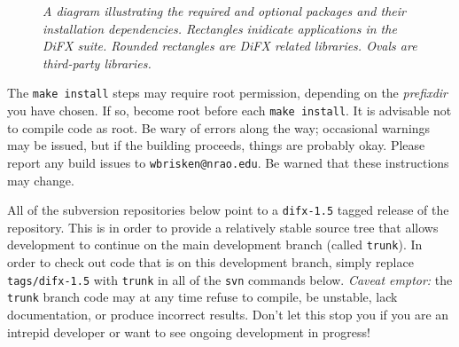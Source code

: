 \begin{figure}[h]
\begin{center}
\caption[dependencies]{
{\em A diagram illustrating the required and optional packages and their installation dependencies.  Rectangles inidicate applications in the DiFX suite.  Rounded rectangles are DiFX related libraries.  Ovals are third-party libraries.}
\label{fig:dependencies}
}
\end{center}
\end{figure}

The {\tt make install} steps may require root permission, depending on the {\em prefixdir} you have chosen.
If so, become root before each {\tt make install}.  
It is advisable not to compile code as root.
Be wary of errors along the way; occasional warnings may be issued, but if the building proceeds, things are probably okay.
Please report any build issues to {\tt wbrisken@nrao.edu}. 
Be warned that these instructions may change.

All of the subversion repositories below point to a {\tt difx-1.5} tagged release of the repository.
This is in order to provide a relatively stable source tree that allows development to continue on the main development branch (called {\tt trunk}).
In order to check out code that is on this development branch, simply replace {\tt tags/difx-1.5} with {\tt trunk} in all of the {\tt svn} commands below.
{\em Caveat emptor: } the {\tt trunk} branch code may at any time refuse to compile, be unstable, lack documentation, or produce incorrect results.
Don't let this stop you if you are an intrepid developer or want to see ongoing development in progress!









